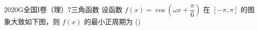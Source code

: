 
\begin{problem}{2020}{G}{全国I卷（理）}{7}{三角函数}
设函数 $ f(x) = \cos\left(\omega x + \dfrac{\pi}{6}\right) $ 在 $ [-\pi, \pi] $ 的图象大致如下图，则 $ f(x) $ 的最小正周期为 (\hspace{1cm})
\begin{choices}
\end{choices}
\end{problem}

\begin{answer}

\end{answer}

\begin{solutions}

\end{solutions}
